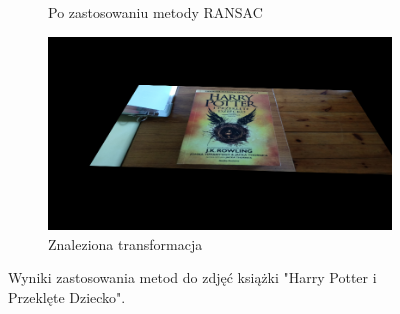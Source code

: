 \documentclass{article}
\begin{document}
\begin{figure}[H]
\begin{subfigure}[b]{0.4\linewidth}
			\caption{Po zastosowaniu metody RANSAC}
		\end{subfigure}
		\begin{subfigure}[b]{0.6\linewidth}
			\includegraphics[width=\linewidth]{k1t.png}
			\caption{Znaleziona transformacja}
		\end{subfigure}
		\caption{Wyniki zastosowania metod do zdjęć książki "Harry Potter i Przeklęte Dziecko".}
		\label{fig:w1}
	\end{figure}
\end{document}
